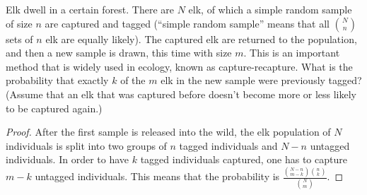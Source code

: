 \begin{exercise}{29}
Elk dwell in a certain forest. There are $N$ elk, of which a simple random sample of
size $n$ are captured and tagged (“simple random sample” means that all $N \choose n$ sets of $n$
elk are equally likely). The captured elk are returned to the population, and then a new
sample is drawn, this time with size $m$. This is an important method that is widely used
in ecology, known as capture-recapture. What is the probability that exactly $k$ of the $m$
elk in the new sample were previously tagged? (Assume that an elk that was captured
before doesn’t become more or less likely to be captured again.)
\end{exercise}

\begin{proof}
After the first sample is released into the wild, the elk population of $N$ individuals is split into two groups of $n$ tagged individuals and $N-n$ untagged individuals. In order to have $k$ tagged individuals captured, one has to capture $m-k$ untagged individuals. This means that the probability is $\frac{{N-n \choose m-k}{n \choose k}}{{N \choose m}}$. 
\end{proof}



